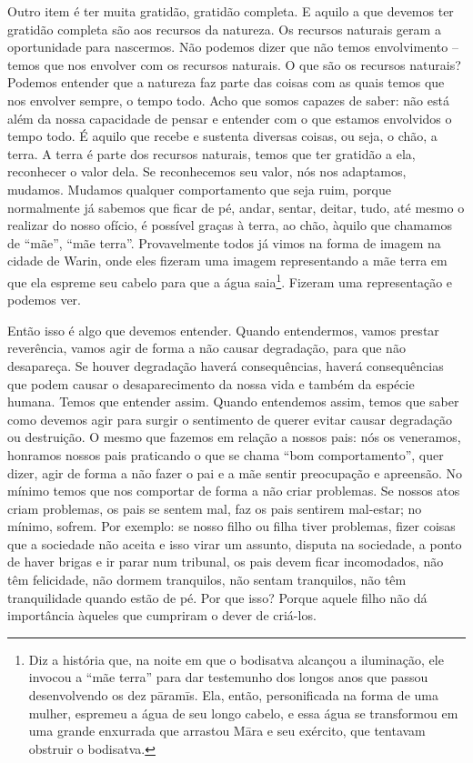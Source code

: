 Outro item é ter muita gratidão, gratidão completa. E aquilo a que
devemos ter gratidão completa são aos recursos da natureza. Os recursos
naturais geram a oportunidade para nascermos. Não podemos dizer que não
temos envolvimento – temos que nos envolver com os recursos naturais. O
que são os recursos naturais? Podemos entender que a natureza faz parte
das coisas com as quais temos que nos envolver sempre, o tempo todo.
Acho que somos capazes de saber: não está além da nossa capacidade de
pensar e entender com o que estamos envolvidos o tempo todo. É aquilo
que recebe e sustenta diversas coisas, ou seja, o chão, a terra. A
terra é parte dos recursos naturais, temos que ter gratidão a ela,
reconhecer o valor dela. Se reconhecemos seu valor, nós nos adaptamos,
mudamos. Mudamos qualquer comportamento que seja ruim, porque
normalmente já sabemos que ficar de pé, andar, sentar, deitar, tudo,
até mesmo o realizar do nosso ofício, é possível graças à terra, ao
chão, àquilo que chamamos de “mãe”, “mãe terra”. Provavelmente todos já
vimos na forma de imagem na cidade de Warin, onde eles fizeram uma
imagem representando a mãe terra em que ela espreme seu cabelo para que
a água saia\footnote{Diz a história que, na noite em que o bodisatva
alcançou a iluminação, ele invocou a “mãe terra” para dar testemunho
dos longos anos que passou desenvolvendo os dez pāramīs. Ela,
então, personificada na forma de uma mulher, espremeu a água de seu
longo cabelo, e essa água se transformou em uma grande enxurrada que
arrastou Māra e seu exército, que tentavam obstruir o bodisatva. }.
Fizeram uma representação e podemos ver. 

Então isso é algo que devemos entender. Quando entendermos, vamos
prestar reverência, vamos agir de forma a não causar degradação, para
que não desapareça. Se houver degradação haverá consequências, haverá
consequências que podem causar o desaparecimento da nossa vida e também
da espécie humana. Temos que entender assim. Quando entendemos assim,
temos que saber como devemos agir para surgir o sentimento de querer
evitar causar degradação ou destruição. O mesmo que fazemos em relação
a nossos pais: nós os veneramos, honramos nossos pais praticando o que
se chama “bom comportamento”, quer dizer, agir de forma a não fazer o
pai e a mãe sentir preocupação e apreensão. No mínimo temos que nos
comportar de forma a não criar problemas. Se nossos atos criam
problemas, os pais se sentem mal, faz os pais sentirem mal-estar; no
mínimo, sofrem. Por exemplo: se nosso filho ou filha tiver problemas,
fizer coisas que a sociedade não aceita e isso virar um assunto,
disputa na sociedade, a ponto de haver brigas e ir parar num tribunal,
os pais devem ficar incomodados, não têm felicidade, não dormem
tranquilos, não sentam tranquilos, não têm tranquilidade quando estão
de pé. Por que isso? Porque aquele filho não dá importância àqueles que
cumpriram o dever de criá-los. 

